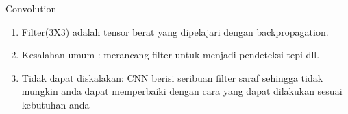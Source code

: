 Convolution
\begin{enumerate}
\item Filter(3X3) adalah tensor berat yang dipelajari dengan backpropagation.
\item Kesalahan umum : merancang filter untuk menjadi pendeteksi tepi dll.
\item Tidak dapat diskalakan: CNN berisi seribuan filter saraf sehingga tidak mungkin anda dapat memperbaiki dengan cara yang dapat dilakukan sesuai kebutuhan anda
\end{enumerate}
